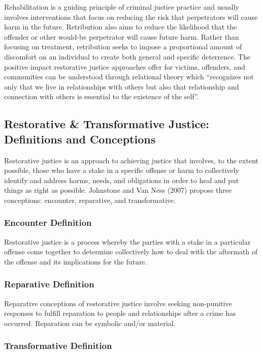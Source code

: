 \documentclass{article}
\begin{document}
Rehabilitation is a guiding principle of criminal justice practice and usually involves interventions that focus on reducing the risk that perpetrators will cause harm in the future. Retribution also aims to reduce the likelihood that the offender or other would-be perpetrator will cause future harm. Rather than focusing on treatment, retribution seeks to impose a proportional amount of discomfort on an individual to create both general and specific deterrence. The positive impact restorative justice approaches offer for victims, offenders, and communities can be understood through relational theory which “recognizes not only that we live in relationships with others but also that relationship and connection with others is essential to the existence of the self”.

\subsection{Restorative \& Transformative Justice: Definitions and Conceptions}

Restorative justice is an approach to achieving justice that involves, to the extent possible, those who have a stake in a specific offense or harm to collectively identify and address harms, needs, and obligations in order to heal and put things as right as possible. Johnstone and Van Ness (2007) propose three conceptions: encounter, reparative, and transformative.

\subsubsection*{Encounter Definition}

Restorative justice is a process whereby the parties with a stake in a particular offense come together to determine collectively how to deal with the aftermath of the offense and its implications for the future.

\subsubsection*{Reparative Definition}

Reparative conceptions of restorative justice involve seeking non-punitive responses to fulfill reparation to people and relationships after a crime has occurred. Reparation can be symbolic and/or material.

\subsubsection*{Transformative Definition}
\end{document}
